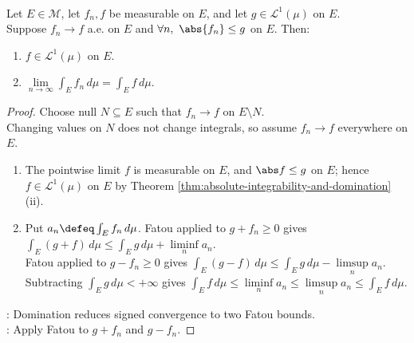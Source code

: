 \begin{theorem} \label{thm:dominated-convergence-lebesgue} \\
Let $E\in\mathcal{M}$, let $f_n,f$ be measurable on $E$, and let $g\in\mathscr{L}^1(\mu)$ on $E$.\\
Suppose $f_n\to f$ a.e. on $E$ and $\forall n,\ \abs{f_n}\leq g$ on $E$. Then:
\begin{enumerate}[label=(\roman*)]
\setlength{\itemsep}{0pt}
\item $f\in\mathscr{L}^1(\mu)$ on $E$.
\item $\lim\limits_{n\to\infty}\int_Ef_n\,d\mu=\int_Ef\,d\mu$.
\end{enumerate}
\begin{proof} Choose null $N\subseteq E$ such that $f_n\to f$ on $E\setminus N$.\\
Changing values on $N$ does not change integrals, so assume $f_n\to f$ everywhere on $E$.
\begin{enumerate}[label=(\roman*)]
\setlength{\itemsep}{0pt}
\item The pointwise limit $f$ is measurable on $E$, and $\abs f\leq g$ on $E$; hence $f\in\mathscr{L}^1(\mu)$ on $E$ by Theorem \ref{thm:absolute-integrability-and-domination}(ii).
\item Put $a_n\defeq\int_Ef_n\,d\mu$. Fatou applied to $g+f_n\geq0$ gives $\int_E(g+f)\,d\mu\leq\int_Eg\,d\mu+\liminf\limits_na_n$.\\
Fatou applied to $g-f_n\geq0$ gives $\int_E(g-f)\,d\mu\leq\int_Eg\,d\mu-\limsup\limits_na_n$.\\
Subtracting $\int_Eg\,d\mu<+\infty$ gives $\int_Ef\,d\mu\leq\liminf\limits_na_n\leq\limsup\limits_na_n\leq\int_Ef\,d\mu$.
\end{enumerate}
: Domination reduces signed convergence to two Fatou bounds.\\
: Apply Fatou to $g+f_n$ and $g-f_n$.
\end{proof}
\end{theorem}

